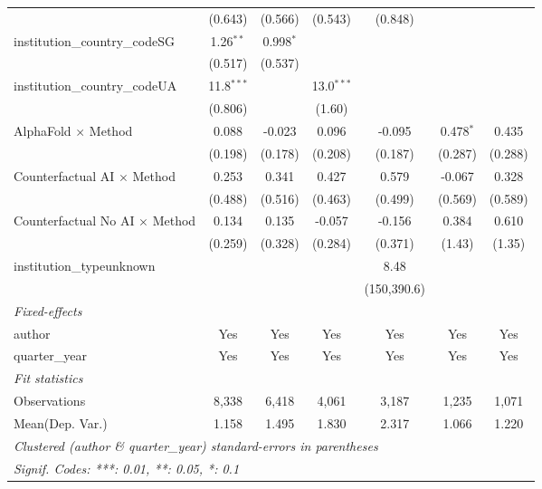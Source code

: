 \begin{tabular}{lcccccc}
                                         & (0.643)       & (0.566)       & (0.543)       & (0.848)       &               &   \\   
   institution\_country\_codeSG          & 1.26$^{**}$   & 0.998$^{*}$   &               &               &               &   \\   
                                         & (0.517)       & (0.537)       &               &               &               &   \\   
   institution\_country\_codeUA          & 11.8$^{***}$  &               & 13.0$^{***}$  &               &               &   \\   
                                         & (0.806)       &               & (1.60)        &               &               &   \\   
   AlphaFold $\times$ Method             & 0.088         & -0.023        & 0.096         & -0.095        & 0.478$^{*}$   & 0.435\\   
                                         & (0.198)       & (0.178)       & (0.208)       & (0.187)       & (0.287)       & (0.288)\\   
   Counterfactual AI $\times$ Method     & 0.253         & 0.341         & 0.427         & 0.579         & -0.067        & 0.328\\   
                                         & (0.488)       & (0.516)       & (0.463)       & (0.499)       & (0.569)       & (0.589)\\   
   Counterfactual No AI $\times$ Method  & 0.134         & 0.135         & -0.057        & -0.156        & 0.384         & 0.610\\   
                                         & (0.259)       & (0.328)       & (0.284)       & (0.371)       & (1.43)        & (1.35)\\   
   institution\_typeunknown              &               &               &               & 8.48          &               &   \\   
                                         &               &               &               & (150,390.6)   &               &   \\   
   \midrule
   \emph{Fixed-effects}\\
   author                                & Yes           & Yes           & Yes           & Yes           & Yes           & Yes\\  
   quarter\_year                         & Yes           & Yes           & Yes           & Yes           & Yes           & Yes\\  
   \midrule
   \emph{Fit statistics}\\
   Observations                          & 8,338         & 6,418         & 4,061         & 3,187         & 1,235         & 1,071\\  
Mean(Dep. Var.) & 1.158 & 1.495 & 1.830 & 2.317 & 1.066 & 1.220 \\
   \midrule \midrule
   \multicolumn{7}{l}{\emph{Clustered (author \& quarter\_year) standard-errors in parentheses}}\\
   \multicolumn{7}{l}{\emph{Signif. Codes: ***: 0.01, **: 0.05, *: 0.1}}\\
\end{tabular}
\par\endgroup
